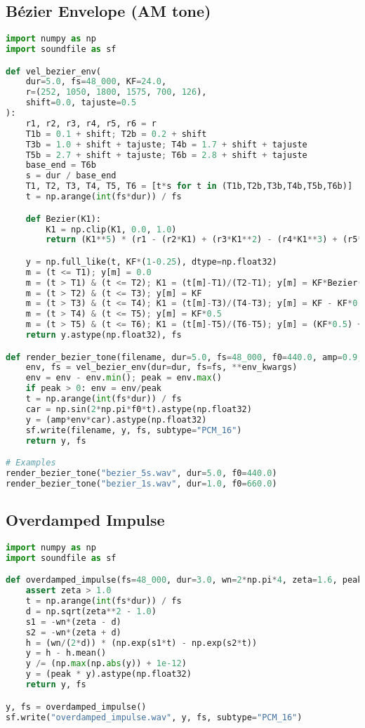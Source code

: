 \documentclass[11pt]{article}
\begin{document}
\subsection*{Bézier Envelope (AM tone)}
\begin{lstlisting}[language=Python, caption={Bézier envelope + sine (writes WAV)}]
import numpy as np
import soundfile as sf

def vel_bezier_env(
    dur=5.0, fs=48_000, KF=24.0,
    r=(252, 1050, 1800, 1575, 700, 126),
    shift=0.0, tajuste=0.5
):
    r1, r2, r3, r4, r5, r6 = r
    T1b = 0.1 + shift; T2b = 0.2 + shift
    T3b = 1.0 + shift + tajuste; T4b = 1.7 + shift + tajuste
    T5b = 2.7 + shift + tajuste; T6b = 2.8 + shift + tajuste
    base_end = T6b
    s = dur / base_end
    T1, T2, T3, T4, T5, T6 = [t*s for t in (T1b,T2b,T3b,T4b,T5b,T6b)]
    t = np.arange(int(fs*dur)) / fs

    def Bezier(K1):
        K1 = np.clip(K1, 0.0, 1.0)
        return (K1**5) * (r1 - (r2*K1) + (r3*K1**2) - (r4*K1**3) + (r5*K1**4) - (r6*K1**5))

    y = np.full_like(t, KF*(1-0.25), dtype=np.float32)
    m = (t <= T1); y[m] = 0.0
    m = (t > T1) & (t <= T2); K1 = (t[m]-T1)/(T2-T1); y[m] = KF*Bezier(K1)
    m = (t > T2) & (t <= T3); y[m] = KF
    m = (t > T3) & (t <= T4); K1 = (t[m]-T3)/(T4-T3); y[m] = KF - KF*0.5*Bezier(K1)
    m = (t > T4) & (t <= T5); y[m] = KF*0.5
    m = (t > T5) & (t <= T6); K1 = (t[m]-T5)/(T6-T5); y[m] = (KF*0.5) + KF*0.25*Bezier(K1)
    return y.astype(np.float32), fs

def render_bezier_tone(filename, dur=5.0, fs=48_000, f0=440.0, amp=0.9, **env_kwargs):
    env, fs = vel_bezier_env(dur=dur, fs=fs, **env_kwargs)
    env = env - env.min(); peak = env.max()
    if peak > 0: env = env/peak
    t = np.arange(int(fs*dur)) / fs
    car = np.sin(2*np.pi*f0*t).astype(np.float32)
    y = (amp*env*car).astype(np.float32)
    sf.write(filename, y, fs, subtype="PCM_16")
    return y, fs

# Examples
render_bezier_tone("bezier_5s.wav", dur=5.0, f0=440.0)
render_bezier_tone("bezier_1s.wav", dur=1.0, f0=660.0)
\end{lstlisting}

\subsection*{Overdamped Impulse}
\begin{lstlisting}[language=Python, caption={Overdamped impulse (writes WAV)}]
import numpy as np
import soundfile as sf

def overdamped_impulse(fs=48_000, dur=3.0, wn=2*np.pi*4, zeta=1.6, peak=0.95):
    assert zeta > 1.0
    t = np.arange(int(fs*dur)) / fs
    d = np.sqrt(zeta**2 - 1.0)
    s1 = -wn*(zeta - d)
    s2 = -wn*(zeta + d)
    h = (wn/(2*d)) * (np.exp(s1*t) - np.exp(s2*t))
    y = h - h.mean()
    y /= (np.max(np.abs(y)) + 1e-12)
    y = (peak * y).astype(np.float32)
    return y, fs

y, fs = overdamped_impulse()
sf.write("overdamped_impulse.wav", y, fs, subtype="PCM_16")
\end{lstlisting}
\end{document}
